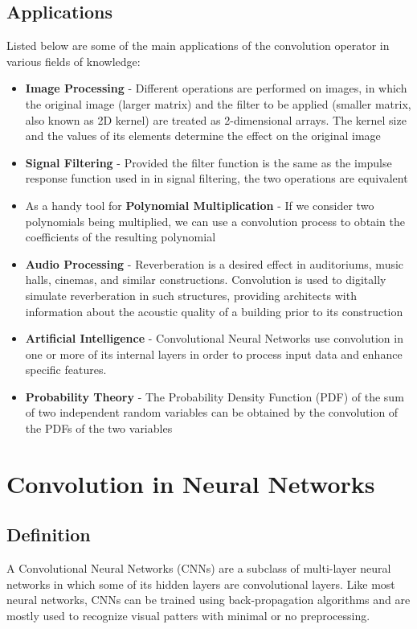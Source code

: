 \subsection{Applications}
\label{sec:convolution:mathematics:applications}
Listed below are some of the main applications of the convolution operator in various fields of knowledge\cite{Srivastava2013}:
\begin{itemize}
	\item \textbf{Image Processing} - Different operations are performed on images, in which the original image (larger matrix) and the filter to be applied (smaller matrix, also known as 2D kernel) are treated as 2-dimensional arrays. The kernel size and the values of its elements determine the effect on the original image
    \item \textbf{Signal Filtering} - Provided the filter function is the same as the impulse response function used in in signal filtering, the two operations are equivalent
    \item As a handy tool for \textbf{Polynomial Multiplication} - If we consider two polynomials being multiplied, we can use a convolution process to obtain the coefficients of the resulting polynomial
    \item \textbf{Audio Processing} - Reverberation is a desired effect in auditoriums, music halls, cinemas, and similar constructions. Convolution is used to digitally simulate reverberation in such structures, providing architects with information about the acoustic quality of a building prior to its construction
    \item \textbf{Artificial Intelligence} - Convolutional Neural Networks use convolution in one or more of its internal layers in order to process input data and enhance specific features.
    \item \textbf{Probability Theory} - The Probability Density Function (PDF) of the sum of two independent random variables can be obtained by the convolution of the PDFs of the two variables
\end{itemize}
\section{Convolution in Neural Networks}
\label{sec:convolution:convolutionalneuralnetworks}
\subsection{Definition}
\label{sec:convolution:convolutionalneuralnetworks:definition}
A Convolutional Neural Networks (CNNs) are a subclass of multi-layer neural networks in which some of its hidden layers are convolutional layers.\newline
Like most neural networks, CNNs can be trained using back-propagation algorithms and are mostly used to recognize visual patters with minimal or no preprocessing\cite{Lawrence1997A}.\newline
{}
